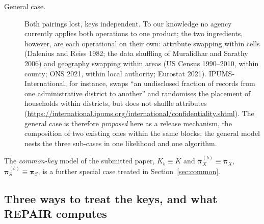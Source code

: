 \documentclass[11pt]{article}
\theoremstyle{definition}
\newcommand{\bpi}{\boldsymbol{\pi}}
\begin{document}
\begin{description}
\item[General case.] Both pairings lost, keys independent. To our knowledge no agency currently applies both operations to one product; the two ingredients, however, are each operational on their own: attribute swapping within cells (Dalenius and Reiss 1982; the data shuffling of Muralidhar and Sarathy 2006) and geography swapping within areas (US Census 1990--2010, within county; ONS 2021, within local authority; Eurostat 2021). IPUMS-International, for instance, swaps ``an undisclosed fraction of records from one administrative district to another'' and randomises the placement of households within districts, but does not shuffle attributes (\url{https://international.ipums.org/international/confidentiality.shtml}). The general case is therefore \emph{proposed} here as a release mechanism, the composition of two existing ones within the same blocks; the general model nests the three sub-cases in one likelihood and one algorithm.
\end{description}
The \emph{common-key} model of the submitted paper, $K_b\equiv K$ and $\bpi_X^{(b)}\equiv\bpi_X$, $\bpi_S^{(b)}\equiv\bpi_S$, is a further special case treated in Section~\ref{sec:common}.

\subsection{Three ways to treat the keys, and what REPAIR computes}\label{sec:targets}
\end{document}
